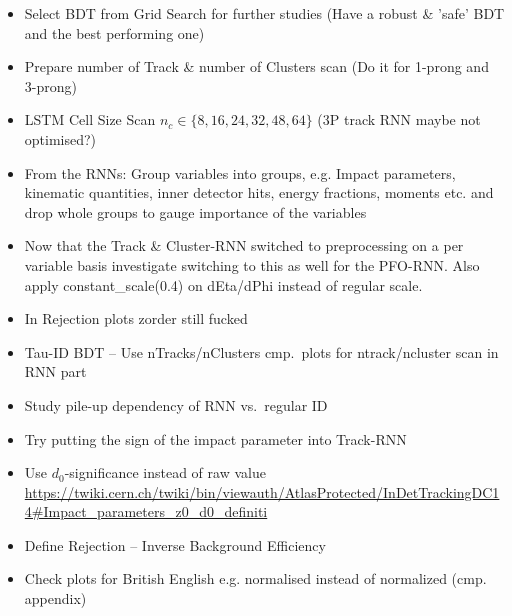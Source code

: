 \begin{itemize}
\item Select BDT from Grid Search for further studies (Have a robust \& 'safe'
  BDT and the best performing one)
\item Prepare number of Track \& number of Clusters scan (Do it for 1-prong and
  3-prong)
\item LSTM Cell Size Scan $n_c \in \{8, 16, 24, 32, 48, 64\}$ (3P track RNN
  maybe not optimised?)
\item From the RNNs: Group variables into groups, e.g. Impact parameters,
  kinematic quantities, inner detector hits, energy fractions, moments etc. and
  drop whole groups to gauge importance of the variables
\item Now that the Track \& Cluster-RNN switched to preprocessing on a per
  variable basis investigate switching to this as well for the PFO-RNN. Also
  apply constant\_scale(0.4) on dEta/dPhi instead of regular scale.
\item In Rejection plots zorder still fucked
\item Tau-ID BDT -- Use nTracks/nClusters cmp.\ plots for ntrack/ncluster scan
  in RNN part
\item Study pile-up dependency of RNN vs.\ regular ID
\item Try putting the sign of the impact parameter into Track-RNN
\item Use $d_0$-significance instead of raw value
  \url{https://twiki.cern.ch/twiki/bin/viewauth/AtlasProtected/InDetTrackingDC14#Impact_parameters_z0_d0_definiti}
\item Define Rejection -- Inverse Background Efficiency
\item Check plots for British English e.g. normalised instead of normalized
  (cmp. appendix)
\end{itemize}


